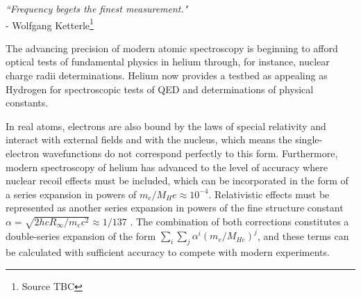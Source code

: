 \begin{adjustwidth}{4cm}{0cm}
\begin{flushright}
\emph{``Frequency begets the finest measurement."\\} 
- Wolfgang Ketterle\footnote{Source TBC}
\end{flushright}
\end{adjustwidth}


The advancing precision of modern atomic spectroscopy is beginning to afford optical tests of fundamental physics in helium through, for instance, nuclear charge radii determinations.
	Helium now provides a testbed as appealing as Hydrogen for spectroscopic tests of QED and determinations of physical constants.

	
In real atoms, electrons are also bound by the laws of special relativity and interact with external fields and with the nucleus, which means the single-electron wavefunctions do not correspond perfectly to this form.
	Furthermore, modern spectroscopy of helium has advanced to the level of accuracy where nuclear recoil effects must be included, which can be incorporated in the form of a series expansion in powers of  $m_e/M_He\approx10^{-4}$.
	Relativistic effects must be represented as another series expansion in powers of the fine structure constant $\alpha=\sqrt{2h c R_\infty/m_e c^2}\approx1/137$ .
	The combination of both corrections constitutes a double-series expansion of the form $\sum_i\sum_j \alpha^i(m_e/M_{He})^j$, and these terms can be calculated with sufficient accuracy to compete with modern experiments.




